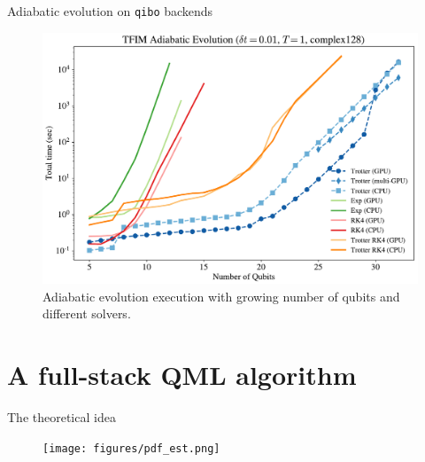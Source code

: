 \documentclass[9pt, xcolor={svgnames}, hyperref={colorlinks, linkcolor=black, citecolor=amethyst, urlcolor=amethyst}]{beamer}
\begin{document}
\begin{frame}{Adiabatic evolution on \texttt{qibo} backends}
\small
\begin{figure}  
\includegraphics[width=0.75 \textwidth]{figures/adiab_evolution.pdf}
\caption{Adiabatic evolution execution with growing number of qubits and different
solvers.}
\end{figure}
\end{frame}


\section{A full-stack QML algorithm}

\begin{frame}{The theoretical idea}
\begin{figure}  
\texttt{[image: figures/pdf\_est.png]}
\end{figure}
\end{frame}
\end{document}
